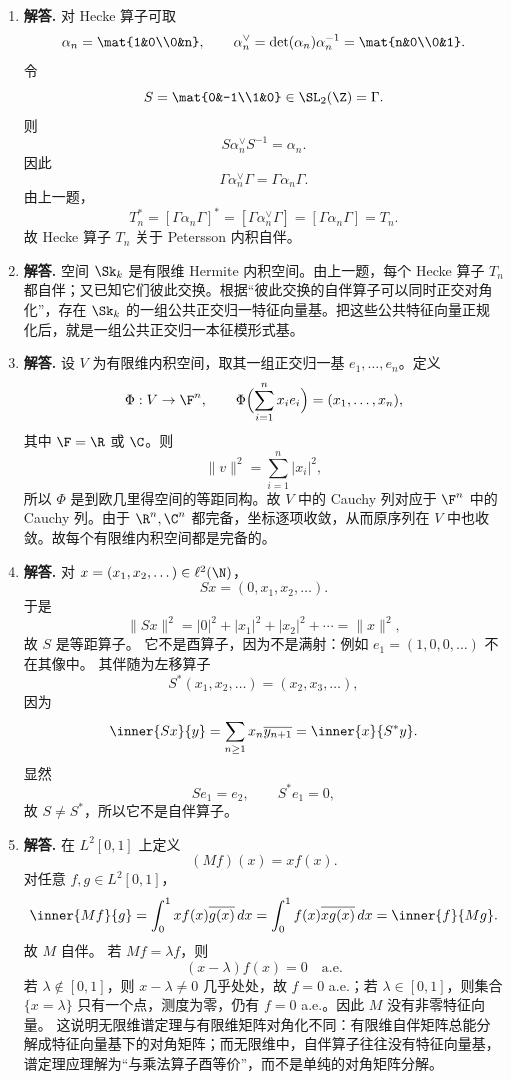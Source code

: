 \begin{enumerate}[label=\textbf{\arabic*.}, leftmargin=*, itemsep=1em]
\item \textbf{解答.} 对 Hecke 算子可取
\[
\alpha_n=\mat{1&0\\0&n},
\qquad
\alpha_n^\vee=\det(\alpha_n)\alpha_n^{-1}=\mat{n&0\\0&1}.
\]
令
\[
S=\mat{0&-1\\1&0}\in \SL_2(\Z)=\Gamma.
\]
则
\[
S\alpha_n^\vee S^{-1}=\alpha_n.
\]
因此
\[
\Gamma\alpha_n^\vee\Gamma=\Gamma\alpha_n\Gamma.
\]
由上一题，
\[
T_n^*=[\Gamma\alpha_n\Gamma]^*=[\Gamma\alpha_n^\vee\Gamma]=[\Gamma\alpha_n\Gamma]=T_n.
\]
故 Hecke 算子 $T_n$ 关于 Petersson 内积自伴。

\item \textbf{解答.} 空间 $\Sk_k$ 是有限维 Hermite 内积空间。由上一题，每个 Hecke 算子 $T_n$ 都自伴；又已知它们彼此交换。根据“彼此交换的自伴算子可以同时正交对角化”，存在 $\Sk_k$ 的一组公共正交归一特征向量基。把这些公共特征向量正规化后，就是一组公共正交归一本征模形式基。

\item \textbf{解答.} 设 $V$ 为有限维内积空间，取其一组正交归一基 $e_1,\dots,e_n$。定义
\[
\Phi:V\to \F^n,\qquad
\Phi\Bigl(\sum_{i=1}^n x_i e_i\Bigr)=(x_1,\dots,x_n),
\]
其中 $\F=\R$ 或 $\C$。则
\[
\|v\|^2=\sum_{i=1}^n |x_i|^2,
\]
所以 $\Phi$ 是到欧几里得空间的等距同构。故 $V$ 中的 Cauchy 列对应于 $\F^n$ 中的 Cauchy 列。由于 $\R^n,\C^n$ 都完备，坐标逐项收敛，从而原序列在 $V$ 中也收敛。故每个有限维内积空间都是完备的。

\item \textbf{解答.} 对 $x=(x_1,x_2,\dots)\in \ell^2(\N)$，
\[
Sx=(0,x_1,x_2,\dots).
\]
于是
\[
\|Sx\|^2=|0|^2+|x_1|^2+|x_2|^2+\cdots=\|x\|^2,
\]
故 $S$ 是等距算子。  
它不是酉算子，因为不是满射：例如 $e_1=(1,0,0,\dots)$ 不在其像中。  
其伴随为左移算子
\[
S^*(x_1,x_2,\dots)=(x_2,x_3,\dots),
\]
因为
\[
\inner{Sx}{y}=\sum_{n\ge1}x_n\overline{y_{n+1}}=\inner{x}{S^*y}.
\]
显然
\[
Se_1=e_2,\qquad S^*e_1=0,
\]
故 $S\ne S^*$，所以它不是自伴算子。

\item \textbf{解答.} 在 $L^2[0,1]$ 上定义
\[
(Mf)(x)=x f(x).
\]
对任意 $f,g\in L^2[0,1]$，
\[
\inner{Mf}{g}=\int_0^1 x f(x)\overline{g(x)}\,dx
=\int_0^1 f(x)\overline{x g(x)}\,dx
=\inner{f}{Mg}.
\]
故 $M$ 自伴。  
若 $Mf=\lambda f$，则
\[
(x-\lambda)f(x)=0\quad \text{a.e.}
\]
若 $\lambda\notin[0,1]$，则 $x-\lambda\ne 0$ 几乎处处，故 $f=0$ a.e.；若 $\lambda\in[0,1]$，则集合 $\{x=\lambda\}$ 只有一个点，测度为零，仍有 $f=0$ a.e.。因此 $M$ 没有非零特征向量。  
这说明无限维谱定理与有限维矩阵对角化不同：有限维自伴矩阵总能分解成特征向量基下的对角矩阵；而无限维中，自伴算子往往没有特征向量基，谱定理应理解为“与乘法算子酉等价”，而不是单纯的对角矩阵分解。
\end{enumerate}




